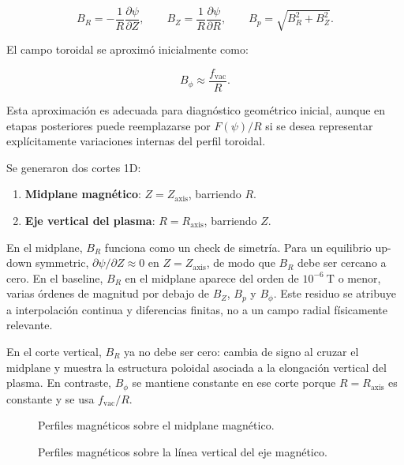 \documentclass[11pt,a4paper]{article}
\begin{document}
\[
B_R = -\frac{1}{R}\frac{\partial \psi}{\partial Z},\qquad
B_Z = \frac{1}{R}\frac{\partial \psi}{\partial R},\qquad
B_p = \sqrt{B_R^2+B_Z^2}.
\]

El campo toroidal se aproximó inicialmente como:

\[
B_\phi \approx \frac{f_{\mathrm{vac}}}{R}.
\]

Esta aproximación es adecuada para diagnóstico geométrico inicial, aunque en etapas posteriores
puede reemplazarse por $F(\psi)/R$ si se desea representar explícitamente variaciones internas
del perfil toroidal.

Se generaron dos cortes 1D:

\begin{enumerate}
    \item \textbf{Midplane magnético}: $Z=Z_{\mathrm{axis}}$, barriendo $R$.
    \item \textbf{Eje vertical del plasma}: $R=R_{\mathrm{axis}}$, barriendo $Z$.
\end{enumerate}

En el midplane, $B_R$ funciona como un check de simetría. Para un equilibrio up-down symmetric,
$\partial\psi/\partial Z\approx0$ en $Z=Z_{\mathrm{axis}}$, de modo que $B_R$ debe ser cercano a
cero. En el baseline, $B_R$ en el midplane aparece del orden de $10^{-6}~\mathrm{T}$ o menor,
varias órdenes de magnitud por debajo de $B_Z$, $B_p$ y $B_\phi$. Este residuo se atribuye a
interpolación continua y diferencias finitas, no a un campo radial físicamente relevante.

En el corte vertical, $B_R$ ya no debe ser cero: cambia de signo al cruzar el midplane y muestra
la estructura poloidal asociada a la elongación vertical del plasma. En contraste, $B_\phi$ se
mantiene constante en ese corte porque $R=R_{\mathrm{axis}}$ es constante y se usa
$f_{\mathrm{vac}}/R$.

\begin{figure}[htbp]
\centering
{}
\caption{Perfiles magnéticos sobre el midplane magnético.}
\label{fig:midplane_fields_placeholder}
\end{figure}

\begin{figure}[htbp]
\centering
{}
\caption{Perfiles magnéticos sobre la línea vertical del eje magnético.}
\label{fig:vertical_axis_fields_placeholder}
\end{figure}
\end{document}
